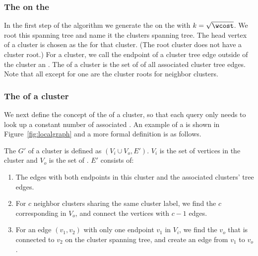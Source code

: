 
\subsubsection{The \imprep{} on the \clustergraph}

In the first step of the algorithm we generate the \imprep{} on the \clustergraph{}
with $k=\sqrt{\wcost}$.  We root this spanning tree and name it
the clusters spanning tree.
The head vertex of a cluster is chosen as the  for that cluster. (The root cluster does not have a cluster root.)
For a cluster, we call the endpoint of a cluster tree edge outside of the cluster an .
The  of a cluster is the set of \outvers{}
of all associated cluster tree edges.  Note that all \outvers{} except
for one are the cluster roots for
neighbor clusters.

\subsubsection{The \localgraph{} of a cluster}

We next define the concept of the \localgraph{} of a cluster, so that each query only needs to look up a constant number of associated .
An example of a \localgraph{} is shown in Figure~\ref{fig:localgraph} and a more formal definition is as follows.



\begin{definition}[\localgraph]
The \localgraph{} $G'$ of a cluster is defined as $(V_i \cup V_o,E')$. $V_i$ is the set of vertices in the cluster and $V_o$ is the set of \outvers{}. $E'$ consists of:
\begin{enumerate}
  \item The edges with both endpoints in this cluster and the associated clusters' tree edges.
  \item For $c$ neighbor clusters sharing the same cluster label, we find the $c$ corresponding \outvers{} in $V_o$, and connect the vertices with $c-1$ edges.
  \item For an edge $(v_1, v_2)$ with only one endpoint $v_1$ in $V_i$, we find the \outver{} $v_o$ that is connected to $v_2$ on the cluster spanning tree, and create an edge from $v_1$ to $v_o$.
\end{enumerate}
\end{definition}

